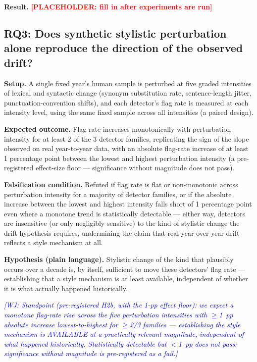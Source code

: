 \documentclass[conference]{IEEEtran}
\newcommand{\placeholder}[1]{\textcolor{red}{\textbf{[PLACEHOLDER: #1]}}}
\newcommand{\wj}[1]{\textcolor{blue}{\emph{[WJ: #1]}}}
\begin{document}
\textbf{Result.} \placeholder{fill in after experiments are run}

\subsection{RQ3: Does synthetic stylistic perturbation alone reproduce the direction of the observed drift?}

 \textbf{Setup.} A single fixed year's human sample is perturbed at five graded intensities of lexical and syntactic change (synonym substitution rate, sentence-length jitter, punctuation-convention shifts), and each detector's flag rate is measured at each intensity level, using the same fixed sample across all intensities (a paired design).

\textbf{Expected outcome.} Flag rate increases monotonically with perturbation intensity for at least 2 of the 3 detector families, replicating the sign of the slope observed on real year-to-year data, with an absolute flag-rate increase of at least 1 percentage point between the lowest and highest perturbation intensity (a pre-registered effect-size floor --- significance without magnitude does not pass).

\textbf{Falsification condition.} Refuted if flag rate is flat or non-monotonic across perturbation intensity for a majority of detector families, or if the absolute increase between the lowest and highest intensity falls short of 1 percentage point even where a monotone trend is statistically detectable --- either way, detectors are insensitive (or only negligibly sensitive) to the kind of stylistic change the drift hypothesis requires, undermining the claim that real year-over-year drift reflects a style mechanism at all.

\textbf{Hypothesis (plain language).} Stylistic change of the kind that plausibly occurs over a decade is, by itself, sufficient to move these detectors' flag rate --- establishing that a style mechanism is at least available, independent of whether it is what actually happened historically.

\wj{Standpoint (pre-registered H2b, with the 1-pp effect floor): we expect a monotone flag-rate rise across the five perturbation intensities with $\geq$1~pp absolute increase lowest-to-highest for $\geq$2/3 families --- establishing the style mechanism is AVAILABLE at a practically relevant magnitude, independent of what happened historically. Statistically detectable but $<$1~pp does not pass: significance without magnitude is pre-registered as a fail.}
\end{document}
